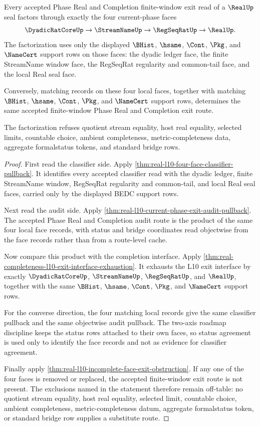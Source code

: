 \begin{theorem}
\label{thm:real-l10-finite-window-completion-exit-factorization}
Every accepted Phase Real and Completion finite-window exit read of a
$\RealUp$ seal factors through exactly the four current-phase faces
$$
\DyadicRatCoreUp \to \StreamNameUp \to \RegSeqRatUp \to \RealUp .
$$
The factorization uses only the displayed $\BHist$, $\hsame$, $\Cont$,
$\Pkg$, and $\NameCert$ support rows on those faces: the dyadic ledger face,
the finite StreamName window face, the RegSeqRat regularity and common-tail
face, and the local Real seal face.

Conversely, matching records on these four local faces, together with matching
$\BHist$, $\hsame$, $\Cont$, $\Pkg$, and $\NameCert$ support rows, determines
the same accepted finite-window Phase Real and Completion exit route.

The factorization refuses quotient stream equality, host real equality,
selected limits, countable choice, ambient completeness,
metric-completeness data, aggregate formalstatus tokens, and standard bridge
rows.
\end{theorem}
\begin{proof}
First read the classifier side. Apply
\autoref{thm:real-l10-four-face-classifier-pullback}. It identifies every
accepted classifier read with the dyadic ledger, finite StreamName window,
RegSeqRat regularity and common-tail, and local Real seal faces, carried only
by the displayed BEDC support rows.

Next read the audit side. Apply
\autoref{thm:real-l10-current-phase-exit-audit-pullback}. The accepted Phase
Real and Completion audit route is the product of the same four local face
records, with status and bridge coordinates read objectwise from the face
records rather than from a route-level cache.

Now compare this product with the completion interface. Apply
\autoref{thm:real-completeness-l10-exit-interface-exhaustion}. It exhausts
the L10 exit interface by exactly $\DyadicRatCoreUp$, $\StreamNameUp$,
$\RegSeqRatUp$, and $\RealUp$, together with the same $\BHist$, $\hsame$,
$\Cont$, $\Pkg$, and $\NameCert$ support rows.

For the converse direction, the four matching local records give the same
classifier pullback and the same objectwise audit pullback. The two-axis
roadmap discipline keeps the status rows attached to their own faces, so
status agreement is used only to identify the face records and not as evidence
for classifier agreement.

Finally apply \autoref{thm:real-l10-incomplete-face-exit-obstruction}. If any
one of the four faces is removed or replaced, the accepted finite-window exit
route is not present. The exclusions named in the statement therefore remain
off-table: no quotient stream equality, host real equality, selected limit,
countable choice, ambient completeness, metric-completeness datum, aggregate
formalstatus token, or standard bridge row supplies a substitute route.
\end{proof}

